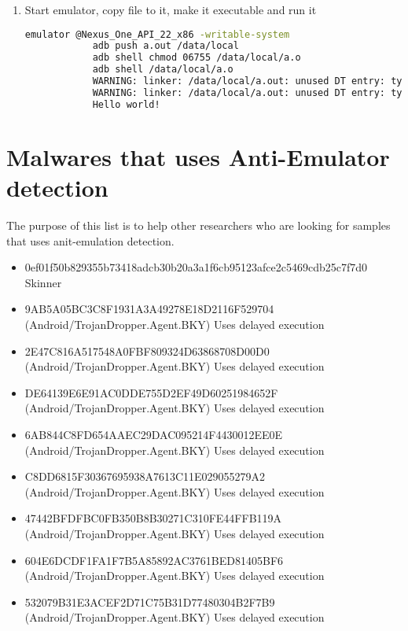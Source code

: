 \documentclass[../main.tex]{subfile}
\begin{document}
\begin{appendices}
\begin{enumerate}
\begin{lstlisting}[language=bash]
			#include<stdio.h>
			int main()
			{
			printf("Hello world!\n");
			return 0;
			}
			^C
			# compiling and linking
			./i686-linux-android-gcc -c main.c  -fPIE
			./i686-linux-android-gcc -lm main.o -pie
			\end{lstlisting}
			\item Start emulator, copy file to it, make it executable and run it
			\begin{lstlisting}[language=bash, firstnumber=15]
			emulator @Nexus_One_API_22_x86 -writable-system
			adb push a.out /data/local
			adb shell chmod 06755 /data/local/a.o
			adb shell /data/local/a.o
			WARNING: linker: /data/local/a.out: unused DT entry: type 0x6ffffffe arg 0x32c
			WARNING: linker: /data/local/a.out: unused DT entry: type 0x6fffffff arg 0x1
			Hello world!
			\end{lstlisting}
		\end{enumerate}
	
	\chapter{Malwares that uses Anti-Emulator detection}
	The purpose of this list is to help other researchers who are looking for samples that uses anit-emulation detection.
	\begin{itemize}
		\item 0ef01f50b829355b73418adcb30b20a3a1f6cb95123afce2c5469cdb25c7f7d0 Skinner
		\item 9AB5A05BC3C8F1931A3A49278E18D2116F529704 (Android/TrojanDropper.Agent.BKY) Uses delayed execution \cite{eset_multi_stage_malware}
		\item 2E47C816A517548A0FBF809324D63868708D00D0 (Android/TrojanDropper.Agent.BKY) Uses delayed execution \cite{eset_multi_stage_malware}
		\item DE64139E6E91AC0DDE755D2EF49D60251984652F (Android/TrojanDropper.Agent.BKY) Uses delayed execution \cite{eset_multi_stage_malware}
		\item 6AB844C8FD654AAEC29DAC095214F4430012EE0E (Android/TrojanDropper.Agent.BKY) Uses delayed execution \cite{eset_multi_stage_malware}
		\item C8DD6815F30367695938A7613C11E029055279A2 (Android/TrojanDropper.Agent.BKY) Uses delayed execution \cite{eset_multi_stage_malware}
		\item 47442BFDFBC0FB350B8B30271C310FE44FFB119A (Android/TrojanDropper.Agent.BKY) Uses delayed execution \cite{eset_multi_stage_malware}
		\item 604E6DCDF1FA1F7B5A85892AC3761BED81405BF6 (Android/TrojanDropper.Agent.BKY) Uses delayed execution \cite{eset_multi_stage_malware}
		\item 532079B31E3ACEF2D71C75B31D77480304B2F7B9 (Android/TrojanDropper.Agent.BKY) Uses delayed execution \cite{eset_multi_stage_malware}
	\end{itemize}
\end{appendices}
\end{document}
